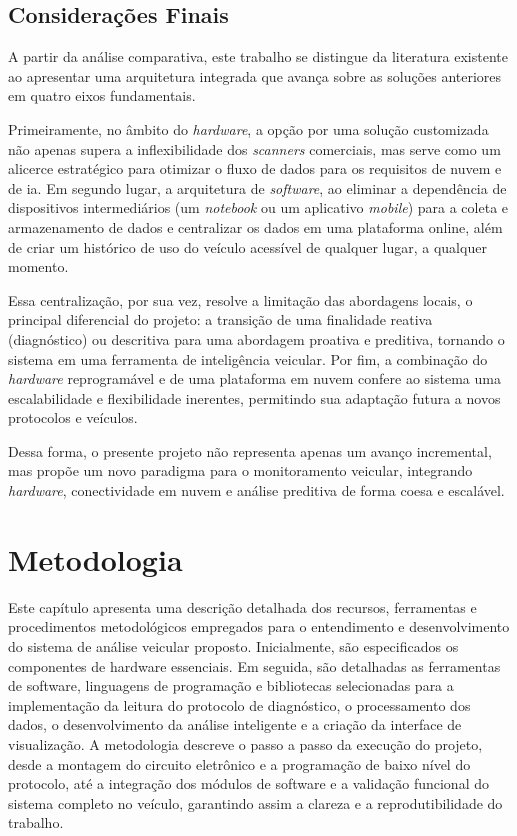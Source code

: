 \documentclass[a4paper, 12pt]{article}
\begin{document}
\subsection{Considerações Finais}

A partir da análise comparativa, este trabalho se distingue da literatura existente ao apresentar uma arquitetura integrada que avança sobre as soluções anteriores em quatro eixos fundamentais. 

Primeiramente, no âmbito do \textit{hardware}, a opção por uma solução customizada não apenas supera a inflexibilidade dos \textit{scanners} comerciais, mas serve como um alicerce estratégico para otimizar o fluxo de dados para os requisitos de nuvem e de \acrshort{ia}. Em segundo lugar, a arquitetura de \textit{software}, ao eliminar a dependência de dispositivos intermediários (um \textit{notebook} ou um aplicativo \textit{mobile})  para a coleta e armazenamento de dados e centralizar os dados em uma plataforma online, além de criar um histórico de uso do veículo acessível de qualquer lugar, a qualquer momento.

Essa centralização, por sua vez, resolve a limitação das abordagens locais, o principal diferencial do projeto: a transição de uma finalidade reativa (diagnóstico) ou descritiva para uma abordagem proativa e preditiva, tornando o sistema em uma ferramenta de inteligência veicular. Por fim, a combinação do \textit{hardware} reprogramável e de uma plataforma em nuvem confere ao sistema uma escalabilidade e flexibilidade inerentes, permitindo sua adaptação futura a novos protocolos e veículos. 

Dessa forma, o presente projeto não representa apenas um avanço incremental, mas propõe um novo paradigma para o monitoramento veicular, integrando \textit{hardware}, conectividade em nuvem e análise preditiva de forma coesa e escalável.

\clearpage

\section{Metodologia}

Este capítulo apresenta uma descrição detalhada dos recursos, ferramentas e procedimentos metodológicos empregados para o entendimento e desenvolvimento do sistema de análise veicular proposto. Inicialmente, são especificados os componentes de hardware essenciais. Em seguida, são detalhadas as ferramentas de software, linguagens de programação e bibliotecas selecionadas para a implementação da leitura do protocolo de diagnóstico, o processamento dos dados, o desenvolvimento da análise inteligente e a criação da interface de visualização. A metodologia descreve o passo a passo da execução do projeto, desde a montagem do circuito eletrônico e a programação de baixo nível do protocolo, até a integração dos módulos de software e a validação funcional do sistema completo no veículo, garantindo assim a clareza e a reprodutibilidade do trabalho.
\end{document}
